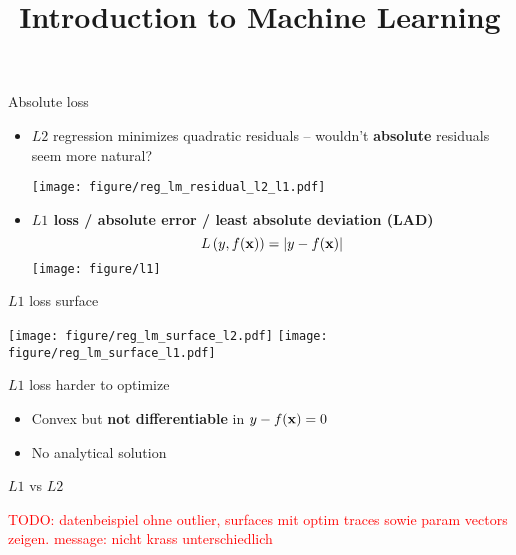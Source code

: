 \documentclass[11pt,compress,t,notes=noshow, xcolor=table]{beamer}
\title{Introduction to Machine Learning}
\institute{\href{https://compstat-lmu.github.io/lecture_i2ml/}{compstat-lmu.github.io/lecture\_i2ml}}
\date{}
\begin{document}


\begin{vbframe}{Absolute loss}

\begin{itemize}
    \item $L2$ regression minimizes quadratic residuals -- wouldn't 
    \textbf{absolute} residuals seem more natural? 
    
    \vspace{0.2cm}
    \texttt{[image: figure/reg\_lm\_residual\_l2\_l1.pdf]}
    \item \textbf{$L1$ loss / absolute error / least absolute deviation (LAD)}
    $$L\left(y, f(\mathbf{x})\right) = |y - f(\mathbf{x})|$$
    \texttt{[image: figure/l1]} 
\end{itemize}

\end{vbframe}


\begin{vbframe}{$L1$ loss surface}

\texttt{[image: 
figure/reg\_lm\_surface\_l2.pdf]}
\texttt{[image: 
figure/reg\_lm\_surface\_l1.pdf]}
\vfill

$L1$ loss harder to optimize
\begin{itemize}
    \item Convex but \textbf{not differentiable} in 
    $y - f(\mathbf{x}) = 0$
    \item No analytical solution
\end{itemize}

\end{vbframe}


\begin{vbframe}{$L1$ vs $L2$}

\textcolor{red}{TODO: datenbeispiel ohne outlier, surfaces mit optim traces 
sowie param vectors zeigen. message: nicht krass unterschiedlich}

\end{vbframe}

\end{document}
